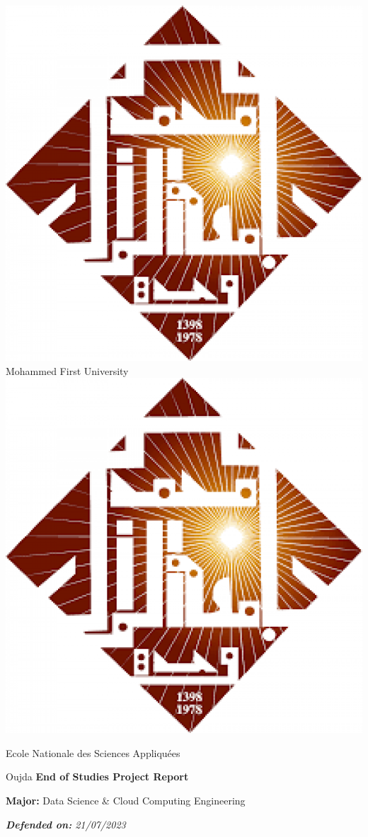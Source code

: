 \documentclass[a4paper,12pt,twoside]{report}
\begin{document}
\begin{titlepage}

\selectfont

\begin{center}
    \includegraphics[scale=0.1]{logos/ump}\hfill
    \LARGE Mohammed First University\hfill
    \includegraphics[scale=0.1]{logos/ump}\par
    \Large Ecole Nationale des Sciences Appliquées\par
    \Large Oujda\vfill
    \Large\textbf{End of Studies Project Report}\par
    \large\textbf{Major:} Data Science \& Cloud Computing Engineering\par
    \textit{\textbf{Defended on:} 21/07/2023}\par
\end{center}


\end{titlepage}
\end{document}
